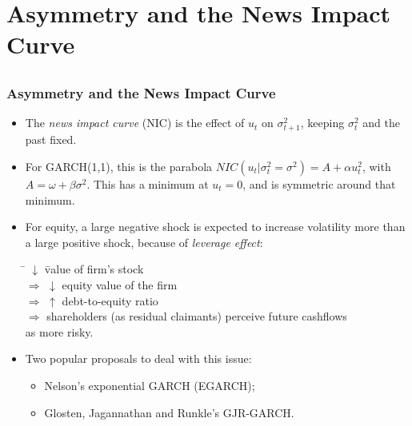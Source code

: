 \section[Asymmetry]{Asymmetry and the News Impact Curve}\subsection*{}
\begin{frame}%

\frametitle{Asymmetry and the News Impact Curve}

\begin{itemize}
\item The \emph{\color{red}news impact curve} (NIC) is the effect of $u_{t}$
on $\sigma _{t+1}^{2}$, keeping $\sigma _{t}^{2}$ and the past fixed.

\item For GARCH(1,1), this is the parabola $NIC(u_{t}|\sigma _{t}^{2}=\sigma
^{2})=A+\alpha u_{t}^{2}$, with $A=\omega +\beta \sigma ^{2}$. This has a
minimum at $u_{t}=0$, and is symmetric around that minimum.

\item For equity, a large negative shock is expected to
increase volatility more than a large positive shock,
because of \emph{\color{red}leverage effect}:
\begin{tabbing}
\hspace{4ex} \= $\downarrow$ \=value of firm's stock \\
$\Rightarrow$ \> $\downarrow$ \> equity value of the firm \\
$\Rightarrow$ \> $\uparrow$ \> debt-to-equity ratio \\
$\Rightarrow$ \> shareholders (as residual claimants) perceive future cashflows\\
\> as more risky.
\end{tabbing}

\item Two popular proposals to deal with this issue:

\begin{itemize}
\item Nelson's exponential GARCH (EGARCH);

\item Glosten, Jagannathan and Runkle's GJR-GARCH.
\end{itemize}
\end{itemize}

\end{frame}%


